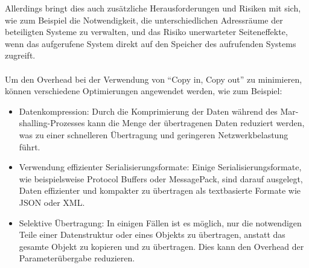 \documentclass[../vs-script-first-v01.tex]{subfiles}
\begin{document}
Allerdings bringt dies auch zusätzliche Herausforderungen und Risiken mit sich, wie zum Beispiel die Notwendigkeit, die unterschiedlichen Adressräume der beteiligten Systeme zu verwalten, und das Risiko unerwarteter Seiteneffekte, wenn das aufgerufene System direkt auf den Speicher des aufrufenden Systems zugreift.
\\\\
Um den Overhead bei der Verwendung von \enquote{Copy in, Copy out} zu minimieren, können verschiedene Optimierungen angewendet werden, wie zum Beispiel:

\begin{itemize} 
\item Datenkompression: Durch die Komprimierung der Daten während des Mar-shalling-Prozesses kann die Menge der übertragenen Daten reduziert werden, was zu einer schnelleren Übertragung und geringeren Netzwerkbelastung führt.
\item Verwendung effizienter Serialisierungsformate: Einige Serialisierungsformate, wie beispielsweise Protocol Buffers oder MessagePack, sind darauf ausgelegt, Daten effizienter und kompakter zu übertragen als textbasierte Formate wie JSON oder XML.
\item Selektive Übertragung: In einigen Fällen ist es möglich, nur die notwendigen Teile einer Datenstruktur oder eines Objekts zu übertragen, anstatt das gesamte Objekt zu kopieren und zu übertragen. Dies kann den Overhead der Parameterübergabe reduzieren.
\end{itemize} 
\end{document}
